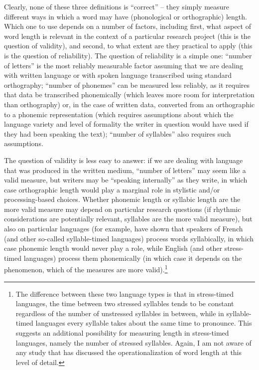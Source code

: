 Clearly, none of these three definitions is ``correct'' -- they simply measure different ways in which a word may have (phonological or orthographic) length. Which one to use depends on a number of factors, including first, what aspect of word length is relevant in the context of a particular research project (this is the question of validity), and second, to what extent are they practical to apply (this is the question of reliability). The question of reliability is a simple one: ``number of letters'' is the most reliably measurable factor assuming that we are dealing with written language or with spoken language transcribed using standard orthography; ``number of phonemes'' can be measured less reliably, as it requires that data be transcribed phonemically (which leaves more room for interpretation than orthography) or, in the case of written data, converted from an orthographic to a phonemic representation (which requires assumptions about which the language variety and level of formality the writer in question would have used if they had been speaking the text); ``number of syllables'' also requires such assumptions.

The question of validity is less easy to answer: if we are dealing with language that was produced in the written medium, ``number of letters'' may seem like a valid measure, but writers may be ``speaking internally'' as they write, in which case orthographic length would play a marginal role in stylistic and/or processing-based choices. Whether phonemic length or syllabic length are the more valid measure may depend on particular research questions (if rhythmic considerations are potentially relevant, syllables are the more valid measure), but also on particular languages (for example, \citet{cutler_syllables_1986} have shown that speakers of French (and other so-called syllable-timed languages) process words syllabically, in which case phonemic length would never play a role, while English (and other stress-timed languages) process them phonemically (in which case it depends on the phenomenon, which of the measures are more valid).\footnote{The difference between these two language types is that in stress-timed languages, the time between two stressed syllables tends to be constant regardless of the number of unstressed syllables in between, while in syllable-timed languages every syllable takes about the same time to pronounce. This suggests an additional possibility for measuring length in stress-timed languages, namely the number of stressed syllables. Again, I am not aware of any study that has discussed the operationalization of word length at this level of detail.}

